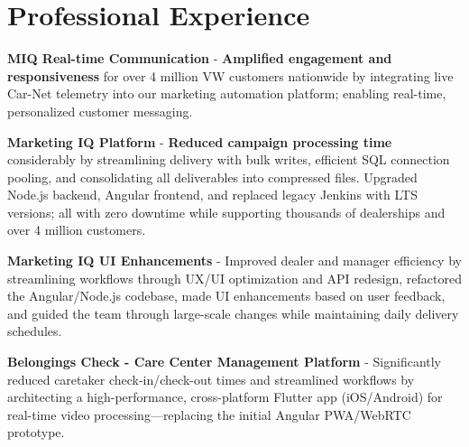 \section{Professional Experience}

\begin{sectionContainer}
	\noindent\normalsize\textbf{MIQ Real-time Communication} - \textbf{Amplified engagement and responsiveness} for over 4 million VW customers nationwide by integrating live Car-Net telemetry into our marketing automation platform; enabling real-time, personalized customer messaging.
\end{sectionContainer}

\begin{sectionContainer}
	\vspace{0.4em} \noindent\normalsize\textbf{Marketing IQ Platform} - \textbf{Reduced campaign processing time} considerably by streamlining delivery with bulk writes, efficient SQL connection pooling, and consolidating all deliverables into compressed files. Upgraded Node.js backend, Angular frontend, and replaced legacy Jenkins with LTS versions; all with zero downtime while supporting thousands of dealerships and over 4 million customers.
\end{sectionContainer}

\begin{sectionContainer}
	\vspace{0.4em} \noindent\normalsize\textbf{Marketing IQ UI Enhancements} - Improved dealer and manager efficiency by streamlining workflows through UX/UI optimization and API redesign, refactored the Angular/Node.js codebase, made UI enhancements based on user feedback, and guided the team through large-scale changes while maintaining daily delivery schedules.
\end{sectionContainer}


\begin{sectionContainer}
	\noindent\normalsize\textbf{Belongings Check - Care Center Management Platform} - Significantly reduced caretaker check-in/check-out times and streamlined workflows by architecting a high-performance, cross-platform Flutter app (iOS/Android) for real-time video processing—replacing the initial Angular PWA/WebRTC prototype.
\end{sectionContainer}

